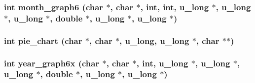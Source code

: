 \subsubsection{\setlength{\rightskip}{0pt plus 5cm}int month\_\-graph6 (char $\ast$, char $\ast$, int, int, u\_\-long $\ast$, u\_\-long $\ast$, u\_\-long $\ast$, double $\ast$, u\_\-long $\ast$, u\_\-long $\ast$)}\label{graphs_8h_5162657b4dcc3453169c3275c52932ea}


\subsubsection{\setlength{\rightskip}{0pt plus 5cm}int pie\_\-chart (char $\ast$, char $\ast$, u\_\-long, u\_\-long $\ast$, char $\ast$$\ast$)}\label{graphs_8h_59a8251be3cd0f8b093804b60c08111e}


\subsubsection{\setlength{\rightskip}{0pt plus 5cm}int year\_\-graph6x (char $\ast$, char $\ast$, int, u\_\-long $\ast$, u\_\-long $\ast$, u\_\-long $\ast$, double $\ast$, u\_\-long $\ast$, u\_\-long $\ast$)}\label{graphs_8h_535fbbd777a3b3e4b015be7fe923c83a}


